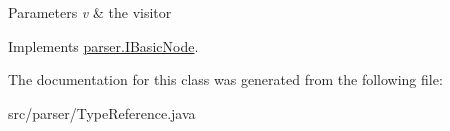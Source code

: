 \begin{DoxyParams}{Parameters}
{\em v} & the visitor \\
\hline
\end{DoxyParams}


Implements \hyperlink{interfaceparser_1_1_i_basic_node_af8790b7076c59e00781ba3d4118757cd}{parser.\+I\+Basic\+Node}.



The documentation for this class was generated from the following file\+:\begin{DoxyCompactItemize}
\item 
src/parser/Type\+Reference.\+java\end{DoxyCompactItemize}
